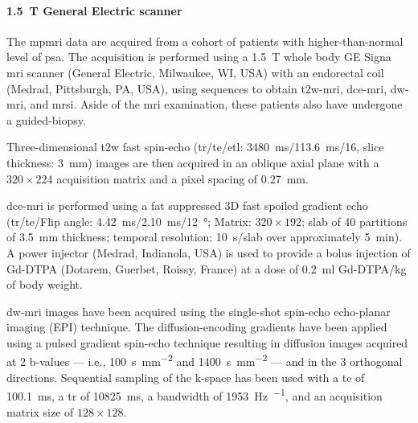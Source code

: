 \paragraph{\SI{1.5}{\tesla} General Electric scanner}

The \ac{mpmri} data are acquired from a cohort of patients with higher-than-normal level of \ac{psa}.
The acquisition is performed using a \SI{1.5}{\tesla} whole body GE Signa \ac{mri} scanner (General Electric, Milwaukee, WI, USA) with an endorectal coil (Medrad, Pittsburgh, PA, USA), using sequences to obtain \ac{t2w}-\ac{mri}, \ac{dce}-\ac{mri}, \ac{dw}-\ac{mri}, and \ac{mrsi}.
Aside of the \ac{mri} examination, these patients also have undergone a guided-biopsy.

Three-dimensional \ac{t2w} fast spin-echo (\ac{tr}/\ac{te}/\ac{etl}: \SI{3480}{\ms}/\SI{113.6}{\ms}/16, slice thickness: \SI{3}{\mm}) images are then acquired in an oblique axial plane with a  $320 \times 224$ acquisition matrix and a pixel spacing of \SI{0.27}{\milli\metre}.


\ac{dce}-\ac{mri} is performed using a fat suppressed 3D fast spoiled gradient echo (\ac{tr}/\ac{te}/Flip angle: \SI{4.42}{\ms}/\SI{2.10}{\ms}/\SI{12}{\degree}; Matrix: $320 \times 192$; slab of 40 partitions of \SI{3.5}{\mm} thickness; temporal resolution: \SI{10}{\s}/slab over approximately \SI{5}{\minute}).
A power injector (Medrad, Indianola, USA) is used to provide a bolus injection of Gd-DTPA (Dotarem, Guerbet, Roissy, France) at a dose of \SI{0.2}{\ml} Gd-DTPA/kg of body weight.

\ac{dw}-\ac{mri} images have been acquired using the single-shot spin-echo echo-planar imaging (EPI) technique.
The diffusion-encoding gradients have been applied using a pulsed gradient spin-echo technique resulting in diffusion images acquired at 2 b-values --- i.e., \SI{100}{\second\per\milli\meter\squared} and \SI{1400}{\second\per\milli\meter\squared} --- and in the 3 orthogonal directions.
Sequential sampling of the k-space has been used with a \ac{te} of \SI{100.1}{\ms}, a \ac{tr} of \SI{10825}{\ms}, a bandwidth of \SI{1953}{\hertz\per\px}, and an acquisition matrix size of $128 \times 128$.

